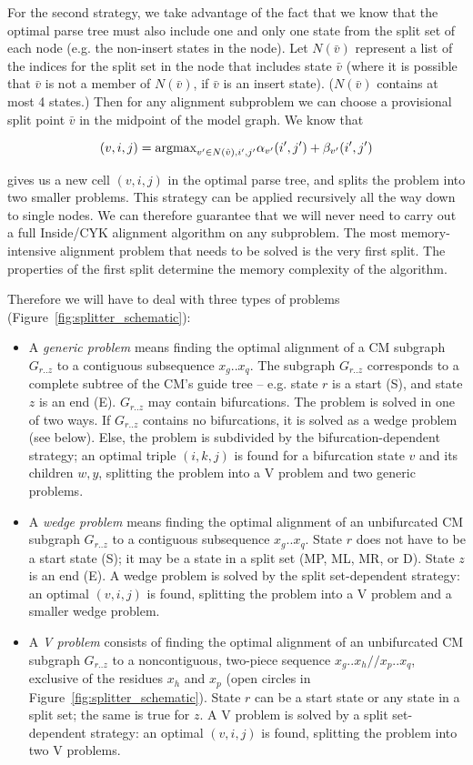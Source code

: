 \documentclass[11pt]{article}
\begin{document}
For the second strategy, we take advantage of the fact that we know
that the optimal parse tree must also include one and only one state
from the split set of each node (e.g. the non-insert states in the
node). Let $N(\bar{v})$ represent a list of the indices for the split
set in the node that includes state $\bar{v}$ (where it is possible
that $\bar{v}$ is not a member of $N(\bar{v})$, if $\bar{v}$ is an
insert state). ($N(\bar{v})$ contains at most 4 states.) Then for any
alignment subproblem we can choose a provisional split point $\bar{v}$
in the midpoint of the model graph. We know that

\[
(v,i,j) = \mbox{\rm{argmax}}_{v' \in N(\hat{v}),i',j'} \alpha_{v'}(i',j') + \beta_{v'}(i',j')
\]

gives us a new cell $(v,i,j)$ in the optimal parse tree, and splits
the problem into two smaller problems. This strategy can be applied
recursively all the way down to single nodes. We can therefore
guarantee that we will never need to carry out a full Inside/CYK
alignment algorithm on any subproblem. The most memory-intensive
alignment problem that needs to be solved is the very first split.
The properties of the first split determine the memory complexity of
the algorithm.

Therefore we will have to deal with three types of problems
(Figure~\ref{fig:splitter_schematic}):

\begin{itemize}
\item A \emph{generic problem} means finding the optimal alignment of
a CM subgraph $G_{r..z}$ to a contiguous subsequence $x_g..x_q$. The
subgraph $G_{r..z}$ corresponds to a complete subtree of the CM's
guide tree -- e.g. state $r$ is a start (S), and state $z$ is an end
(E). $G_{r..z}$ may contain bifurcations. The problem is solved in one
of two ways. If $G_{r..z}$ contains no bifurcations, it is solved as a
wedge problem (see below). Else, the problem is subdivided by the
bifurcation-dependent strategy; an optimal triple $(i,k,j)$ is found
for a bifurcation state $v$ and its children $w,y$, splitting the
problem into a V problem and two generic problems.

\item A \emph{wedge problem} means finding the optimal alignment of an
unbifurcated CM subgraph $G_{r..z}$ to a contiguous subsequence
$x_g..x_q$. State $r$ does not have to be a start state (S); it may be
a state in a split set (MP, ML, MR, or D). State $z$ is an end (E).  A
wedge problem is solved by the split set-dependent strategy: an
optimal $(v,i,j)$ is found, splitting the problem into a V
problem and a smaller wedge problem.

\item A \emph{V problem} consists of finding the optimal alignment of
an unbifurcated CM subgraph $G_{r..z}$ to a noncontiguous, two-piece
sequence $x_g..x_h//x_p..x_q$, exclusive of the residues $x_h$ and
$x_p$ (open circles in Figure~\ref{fig:splitter_schematic}).  State
$r$ can be a start state or any state in a split set; the same is true
for $z$. A V problem is solved by a split set-dependent strategy: an
optimal $(v,i,j)$ is found, splitting the problem into two V problems.
\end{itemize}
\end{document}
